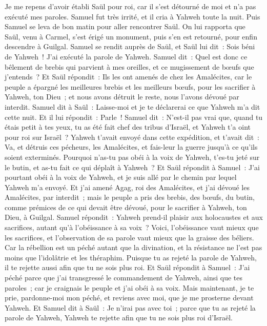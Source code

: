 \begin{multicols}{2}
Je me repens d'avoir établi Saül pour roi, car il s'est détourné de moi et n'a pas exécuté mes paroles. Samuel fut très irrité, et il cria à Yahweh toute la nuit.
Puis Samuel se leva de bon matin pour aller rencontrer Saül. On lui rapporta que Saül, venu à Carmel, s'est érigé un monument, puis s'en est retourné, pour enfin descendre à Guilgal.
Samuel se rendit auprès de Saül, et Saül lui dit~: Sois béni de Yahweh~! J'ai exécuté la parole de Yahweh.
Samuel dit~: Quel est donc ce bêlement de brebis qui parvient à mes oreilles, et ce mugissement de bœufs que j'entends~?
Et Saül répondit~: Ils les ont amenés de chez les Amalécites, car le peuple a épargné les meilleures brebis et les meilleurs bœufs, pour les sacrifier à Yahweh, ton Dieu~; et nous avons détruit le reste, nous l'avons dévoué par interdit.
Samuel dit à Saül~: Laisse-moi et je te déclarerai ce que Yahweh m'a dit cette nuit. Et il lui répondit~: Parle~!
Samuel dit~: N'est-il pas vrai que, quand tu étais petit à tes yeux, tu as été fait chef des tribus d'Israël, et Yahweh t'a oint pour roi sur Israël~?
Yahweh t'avait envoyé dans cette expédition, et t'avait dit~: Va, et détruis ces pécheurs, les Amalécites, et fais-leur la guerre jusqu'à ce qu'ils soient exterminés.
Pourquoi n'as-tu pas obéi à la voix de Yahweh, t'es-tu jeté sur le butin, et as-tu fait ce qui déplaît à Yahweh~?
Et Saül répondit à Samuel~: J'ai pourtant obéi à la voix de Yahweh, et je suis allé par le chemin par lequel Yahweh m'a envoyé. Et j'ai amené Agag, roi des Amalécites, et j'ai dévoué les Amalécites, par interdit~;
mais le peuple a pris des brebis, des bœufs, du butin, comme prémices de ce qui devait être dévoué, pour le sacrifier à Yahweh, ton Dieu, à Guilgal.
Samuel répondit~: Yahweh prend-il plaisir aux holocaustes et aux sacrifices, autant qu'à l'obéissance à sa voix~? Voici, l'obéissance vaut mieux que les sacrifices, et l'observation de sa parole vaut mieux que la graisse des béliers.
Car la rébellion est un péché autant que la divination, et la résistance ne l'est pas moins que l'idolâtrie et les théraphim. Puisque tu as rejeté la parole de Yahweh, il te rejette aussi afin que tu ne sois plus roi.
Et Saül répondit à Samuel~: J'ai péché parce que j'ai transgressé le commandement de Yahweh, ainsi que tes paroles~; car je craignais le peuple et j'ai obéi à sa voix.
Mais maintenant, je te prie, pardonne-moi mon péché, et reviens avec moi, que je me prosterne devant Yahweh.
Et Samuel dit à Saül~: Je n'irai pas avec toi~; parce que tu as rejeté la parole de Yahweh, Yahweh te rejette afin que tu ne sois plus roi d'Israël.

\end{multicols}
